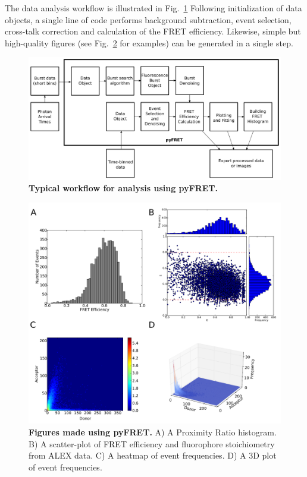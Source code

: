 The data analysis workflow is illustrated in Fig.~\ref{fig:fig2_workflow} Following initialization of data objects, a single line of code performs background subtraction, event selection, cross-talk correction and calculation of the FRET efficiency. Likewise, simple but high-quality figures (see Fig.~\ref{fig:fig3_sample_results} for examples) can be generated in a single step.

\begin{figure}[!ht]
   \begin{center}
      \includegraphics*[clip=true, width=6in]{pyFRET/workflow.pdf}
      \caption{{\bf Typical workflow for analysis using pyFRET.}}
      \label{fig:fig2_workflow}
   \end{center}
\end{figure}

\begin{figure}[!ht]
   \begin{center}
      \includegraphics*[clip=true, width=6in]{pyFRET/6bp_example.pdf}
      \caption{{\bf Figures made using pyFRET.} A) A Proximity Ratio histogram. B) A scatter-plot of FRET efficiency and fluorophore stoichiometry from ALEX data. C) A heatmap of event frequencies.  D) A 3D plot of event frequencies.}
      \label{fig:fig3_sample_results}
   \end{center}
\end{figure}


